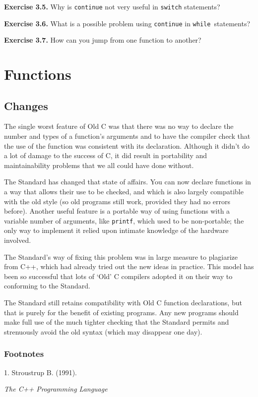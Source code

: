   \textbf{Exercise 3.5.} Why is \texttt{continue} not very useful in
   \texttt{switch} statements?


  \textbf{Exercise 3.6.} What is a possible problem using \texttt{continue}
   in \texttt{while }statements?


  \textbf{Exercise 3.7.} How can you jump from one function to
   another?


 \chapter{Functions}


        \section{Changes}
        

  

  The single worst feature of Old C was that there was no way to declare
   the number and types of a function's arguments and to have the compiler
   check that the use of the function was consistent with its declaration.
   Although it didn't do a lot of damage to the success of C, it did result
   in portability and maintainability problems that we all could have done
   without.


  The Standard has changed that state of affairs. You can now declare
   functions in a way that allows their use to be checked, and which is also
   largely compatible with the old style (so old programs still work,
   provided they had no errors before). Another useful feature is a portable
   way of using functions with a variable number of arguments, like
   \texttt{printf}, which used to be non-portable; the only way to
   implement it relied upon intimate knowledge of the hardware involved.


  The Standard's way of fixing this problem was in large measure to
   plagiarize from C++, which had already tried out the new ideas in
   practice. This model has been so successful that lots of `Old' C
   compilers adopted it on their way to conforming to the Standard.


  The Standard still retains compatibility with Old C function
   declarations, but that is purely for the benefit of existing programs.
   Any new programs should make full use of the much tighter checking that
   the Standard permits and strenuously avoid the old syntax (which may
   disappear one day).


 \subsection{Footnotes}1. Stroustrup
     B. (1991). \begin{center}\textit{The C++ Programming Language}\end{center}


